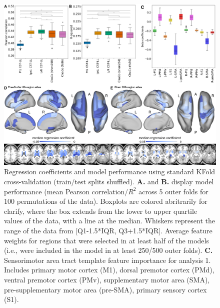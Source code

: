\documentclass[10pt]{article}
\begin{document}
\begin{figure}[htp]
\centering
\includegraphics[width=1\linewidth]{figures/Analysis1.png}
\caption{Regression coefficients and model performance using standard KFold cross-validation (train/test splits shuffled). \textbf{A.} and \textbf{B.} display model performance (mean Pearson correlation/$R^2$ across 5 outer folds for 100 permutations of the data). Boxplots are colored abritrarily for clarify, where the box extends from the lower to upper quartile values of the data, with a line at the median. Whiskers represent the range of the data from [Q1-1.5*IQR, Q3+1.5*IQR].
Average feature weights for regions that were selected in at least half of the models (i.e., were included in the model in at least 250/500 outer folds). \textbf{C.} Sensorimotor area tract template feature importance for analysis 1. Includes primary motor cortex (M1), dorsal premotor cortex (PMd), ventral premotor cortex (PMv), supplementary motor area (SMA), pre-supplementary motor area (pre-SMA), primary sensory cortex (S1).}
\label{analysis1}
\end{figure}
\end{document}
